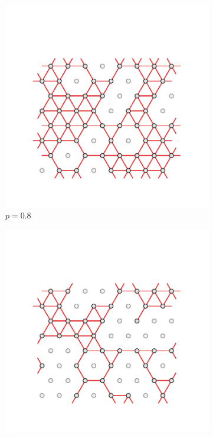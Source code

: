 \begin{figure}[bt]
     \centering
         
     \begin{subfigure}[b]{0.3\textwidth}
         \centering
         \includegraphics[width=\textwidth]{./figures/targeted_opt/perc_tri_8.pdf}
         \caption{$p=0.8$}
         \label{fig:perctri8}
     \end{subfigure}
     \hfill
      \begin{subfigure}[b]{0.3\textwidth}
         \centering
         \includegraphics[width=\textwidth]{./figures/targeted_opt/perc_tri_6.pdf}

\end{subfigure}
\end{figure}
